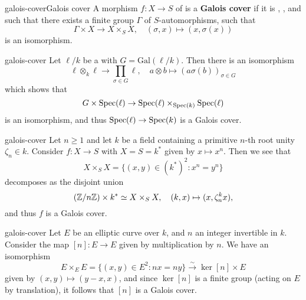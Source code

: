 \begin{topic}{galois-cover}{Galois cover}
    A morphism $f : X \to S$ of  is a \textbf{Galois cover} if it is , , and such that there exists a finite group $\Gamma$ of $S$-automorphisms, such that
    \[ \Gamma \times X \to X \times_S X, \quad (\sigma, x) \mapsto (x, \sigma(x)) \]
    is an isomorphism.
\end{topic}

\begin{example}{galois-cover}
    Let $\ell / k$ be a  with  $G = \text{Gal}(\ell/k)$. Then there is an isomorphism
    \[ \ell \otimes_k \ell \to \prod_{\sigma \in G} \ell, \quad a \otimes b \mapsto (a \sigma(b))_{\sigma \in G} \]
    which shows that
    \[ G \times \operatorname{Spec}(\ell) \to \operatorname{Spec}(\ell) \times_{\operatorname{Spec}(k)} \operatorname{Spec}(\ell) \]
    is an isomorphism, and thus $\operatorname{Spec}(\ell) \to \operatorname{Spec}(k)$ is a Galois cover.
\end{example}

\begin{example}{galois-cover}
    Let $n \ge 1$ and let $k$ be a field containing a primitive $n$-th root unity $\zeta_n \in k$. Consider $f : X \to S$ with $X = S = k^*$ given by $x \mapsto x^n$. Then we see that
    \[ X \times_S X = \{ (x, y) \in (k^*)^2 : x^n = y^n \} \]
    decomposes as the disjoint union
    \[ (\mathbb{Z}/n\mathbb{Z}) \times k^* \simeq X \times_S X, \quad (k, x) \mapsto (x, \zeta_n^k x) , \]
    and thus $f$ is a Galois cover.
\end{example}

\begin{example}{galois-cover}
    Let $E$ be an elliptic curve over $k$, and $n$ an integer invertible in $k$. Consider the map $[n] : E \to E$ given by multiplication by $n$. We have an isomorphism
    \[ E \times_E E = \{ (x, y) \in E^2 : nx = ny \} \xrightarrow{\sim} \ker [n] \times E \]
    given by $(x, y) \mapsto (y - x, x)$, and since $\ker [n]$ is a finite group (acting on $E$ by translation), it follows that $[n]$ is a Galois cover.
\end{example}

